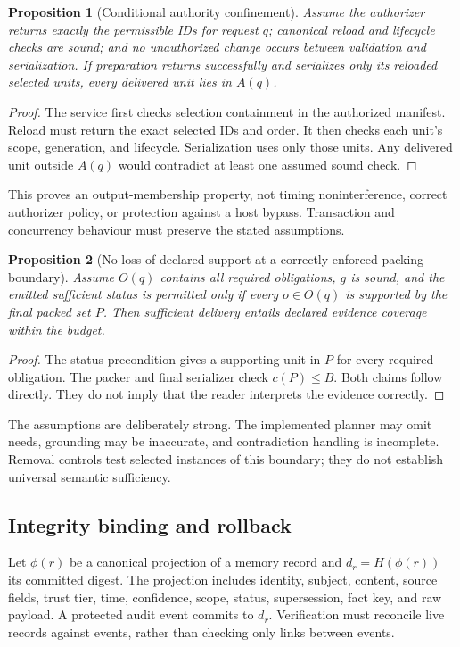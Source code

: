\documentclass[10pt,twocolumn]{article}
\newtheorem{proposition}{Proposition}
\begin{document}
\begin{proposition}[Conditional authority confinement]
Assume the authorizer returns exactly the permissible IDs for request $q$; canonical reload and lifecycle checks are sound; and no unauthorized change occurs between validation and serialization. If preparation returns successfully and serializes only its reloaded selected units, every delivered unit lies in $A(q)$.
\end{proposition}
\begin{proof}
The service first checks selection containment in the authorized manifest. Reload must return the exact selected IDs and order. It then checks each unit's scope, generation, and lifecycle. Serialization uses only those units. Any delivered unit outside $A(q)$ would contradict at least one assumed sound check.
\end{proof}
This proves an output-membership property, not timing noninterference, correct authorizer policy, or protection against a host bypass. Transaction and concurrency behaviour must preserve the stated assumptions.

\begin{proposition}[No loss of declared support at a correctly enforced packing boundary]
Assume $O(q)$ contains all required obligations, $g$ is sound, and the emitted sufficient status is permitted only if every $o\in O(q)$ is supported by the final packed set $P$. Then sufficient delivery entails declared evidence coverage within the budget.
\end{proposition}
\begin{proof}
The status precondition gives a supporting unit in $P$ for every required obligation. The packer and final serializer check $c(P)\leq B$. Both claims follow directly. They do not imply that the reader interprets the evidence correctly.
\end{proof}
The assumptions are deliberately strong. The implemented planner may omit needs, grounding may be inaccurate, and contradiction handling is incomplete. Removal controls test selected instances of this boundary; they do not establish universal semantic sufficiency.

\subsection{Integrity binding and rollback}
Let $\phi(r)$ be a canonical projection of a memory record and $d_r=H(\phi(r))$ its committed digest. The projection includes identity, subject, content, source fields, trust tier, time, confidence, scope, status, supersession, fact key, and raw payload. A protected audit event commits to $d_r$. Verification must reconcile live records against events, rather than checking only links between events.
\end{document}
